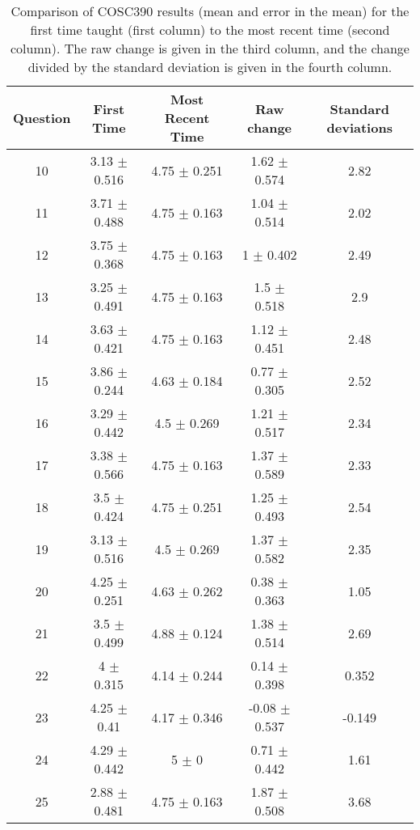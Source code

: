 \documentclass[../../main.tex]{subfiles}
\begin{document}
\begin{table}
\small
\centering
\begin{tabular}{| c | c | c | c | c |}
\hline
\hline
Question & First Time & Most Recent Time & Raw change & Standard deviations \\
\hline
10 & 3.13 $\pm$ 0.516 & 4.75 $\pm$ 0.251 & 1.62 $\pm$ 0.574 & 2.82 \\ \hline
11 & 3.71 $\pm$ 0.488 & 4.75 $\pm$ 0.163 & 1.04 $\pm$ 0.514 & 2.02 \\ \hline
12 & 3.75 $\pm$ 0.368 & 4.75 $\pm$ 0.163 & 1 $\pm$ 0.402 & 2.49 \\ \hline
13 & 3.25 $\pm$ 0.491 & 4.75 $\pm$ 0.163 & 1.5 $\pm$ 0.518 & 2.9 \\ \hline
14 & 3.63 $\pm$ 0.421 & 4.75 $\pm$ 0.163 & 1.12 $\pm$ 0.451 & 2.48 \\ \hline
15 & 3.86 $\pm$ 0.244 & 4.63 $\pm$ 0.184 & 0.77 $\pm$ 0.305 & 2.52 \\ \hline
16 & 3.29 $\pm$ 0.442 & 4.5 $\pm$ 0.269 & 1.21 $\pm$ 0.517 & 2.34 \\ \hline
17 & 3.38 $\pm$ 0.566 & 4.75 $\pm$ 0.163 & 1.37 $\pm$ 0.589 & 2.33 \\ \hline
18 & 3.5 $\pm$ 0.424 & 4.75 $\pm$ 0.251 & 1.25 $\pm$ 0.493 & 2.54 \\ \hline
19 & 3.13 $\pm$ 0.516 & 4.5 $\pm$ 0.269 & 1.37 $\pm$ 0.582 & 2.35 \\ \hline
20 & 4.25 $\pm$ 0.251 & 4.63 $\pm$ 0.262 & 0.38 $\pm$ 0.363 & 1.05 \\ \hline
21 & 3.5 $\pm$ 0.499 & 4.88 $\pm$ 0.124 & 1.38 $\pm$ 0.514 & 2.69 \\ \hline
22 & 4 $\pm$ 0.315 & 4.14 $\pm$ 0.244 & 0.14 $\pm$ 0.398 & 0.352 \\ \hline
23 & 4.25 $\pm$ 0.41 & 4.17 $\pm$ 0.346 & -0.08 $\pm$ 0.537 & -0.149 \\ \hline
24 & 4.29 $\pm$ 0.442 & 5 $\pm$ 0 & 0.71 $\pm$ 0.442 & 1.61 \\ \hline
25 & 2.88 $\pm$ 0.481 & 4.75 $\pm$ 0.163 & 1.87 $\pm$ 0.508 & 3.68 \\ \hline
\hline
\end{tabular}
\caption{\label{tab:courses:adv_shifts} Comparison of COSC390 results (mean and error in the mean) for the first time taught (first column) to the most recent time (second column). The raw change is given in the third column, and the change divided by the standard deviation is given in the fourth column.}
\end{table}
\end{document}
